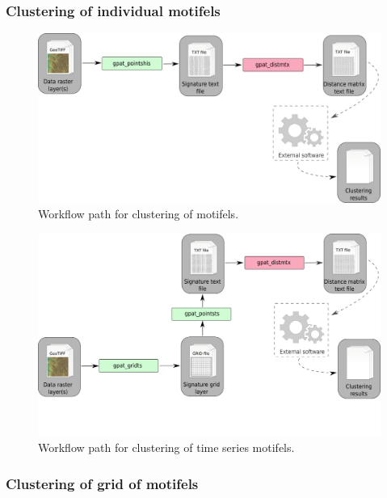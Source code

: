 \documentclass[12pt,margin=0.5in]{article}
\begin{document}
\subsubsection{Clustering of individual motifels}

\begin{figure}[h]
	\centering
	\includegraphics[width=\textwidth]{cluster_points_scheme.png}
	\caption{Workflow path for clustering of motifels.}
	\label{FIG:CLUSTER_POINTS}
\end{figure}

\begin{figure}[h]
	\centering
	\includegraphics[width=\textwidth]{cluster_pointsts_scheme.png}
	\caption{Workflow path for clustering of time series motifels.}
	\label{FIG:CLUSTER_POINTSTS}
\end{figure}

\FloatBarrier

\subsubsection{Clustering of grid of motifels}
\end{document}
